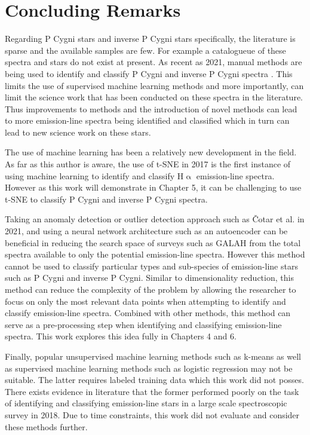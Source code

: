 \section{Concluding Remarks}

Regarding P Cygni stars and inverse P Cygni stars specifically, the literature is sparse and the available samples are few. For example a catalogueue of these spectra and stars do not exist at present. As recent as 2021, manual methods are being used to identify and classify P Cygni and inverse P Cygni spectra \cite{zhao2012lamost}. This limits the use of supervised machine learning methods and more importantly, can limit the science work that has been conducted on these spectra in the literature. Thus improvements to methods and the introduction of novel methods can lead to more emission-line spectra being identified and classified which in turn can lead to new science work on these stars. 

The use of machine learning has been a relatively new development in the field. As far as this author is aware, the use of t-SNE in 2017 is the first instance of using machine learning to identify and classify H$\upalpha$ emission-line spectra. However as this work will demonstrate in Chapter 5, it can be challenging to use t-SNE to classify P Cygni and inverse P Cygni spectra. 

Taking an anomaly detection or outlier detection approach such as Čotar et al. in 2021, and using a neural network architecture such as an autoencoder can be beneficial in reducing the search space of surveys such as GALAH from the total spectra available to only the potential emission-line spectra. However this method cannot be used to classify particular types and sub-species of emission-line stars such as P Cygni and inverse P Cygni. Similar to dimensionality reduction, this method can reduce the complexity of the problem by allowing the researcher to focus on only the most relevant data points when attempting to identify and classify emission-line spectra. Combined with other methods, this method can serve as a pre-processing step when identifying and classifying emission-line spectra. This work explores this idea fully in Chapters 4 and 6. 

Finally, popular unsupervised machine learning methods such as k-means as well as supervised machine learning methods such as logistic regression may not be suitable. The latter requires labeled training data\cite{zhang2021catalog} which this work did not posses. There exists evidence in literature that the former performed poorly on the task of identifying and classifying emission-line stars in a large scale spectroscopic survey in 2018\cite{garcia2018machine}. Due to time constraints, this work did not evaluate and consider these methods further.

